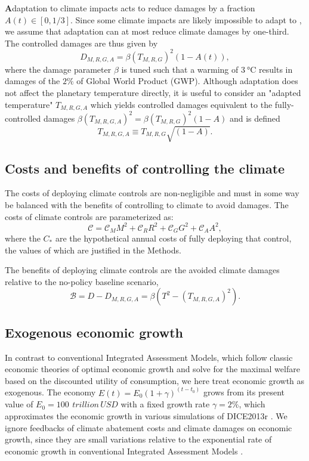 \documentclass[9pt,twocolumn,twoside,lineno]{pnas-new}
\begin{document}
\textbf{A}daptation to climate impacts acts to reduce damages by a fraction $A(t) \in [0, 1/3]$. Since some climate impacts are likely impossible to adapt to \cite[][]{dow_limits_2013}, we assume that adaptation can at most reduce climate damages by one-third. The controlled damages are thus given by
\begin{equation}
    D_{M,R,G,A} = \beta (T_{M,R,G})^{2} (1-A(t)),
    \label{eq:damages}
\end{equation}
where the damage parameter $\beta$ is tuned such that a warming of $\SI{3}{\celsius}$ results in damages of the $2\%$ of Global World Product (GWP). Although adaptation does not affect the planetary temperature directly, it is useful to consider an "adapted temperature" $T_{M,R,G,A}$ which yields controlled damages equivalent to the fully-controlled damages $\beta (T_{M,R,G,A})^{2} = \beta (T_{M,R,G})^{2} (1-A)$ and is defined
\begin{equation}
    T_{M,R,G,A} \equiv T_{M,R,G} \sqrt{(1-A)}.\label{eq:adapted-temperature}
\end{equation}

\subsection*{Costs and benefits of controlling the climate}

The costs of deploying climate controls are non-negligible and must in some way be balanced with the benefits of controlling to climate to avoid damages. The costs of climate controls are parameterized as:
\begin{equation}
    \mathcal{C} = \mathcal{C}_{M} M^{2} + \mathcal{C}_{R} R^{2} + \mathcal{C}_{G} G^{2} + \mathcal{C}_{A} A^{2},
\end{equation}
where the $C_{*}$ are the hypothetical annual costs of fully deploying that control, the values of which are justified in the Methods.

The benefits of deploying climate controls are the avoided climate damages relative to the no-policy baseline scenario,
\begin{equation}
    \mathcal{B} = D - D_{M,R,G,A} = \beta (T^{2} - (T_{M,R,G,A})^{2}).
\end{equation}

\subsection*{Exogenous economic growth}
In contrast to conventional Integrated Assessment Models, which follow classic economic theories of optimal economic growth and solve for the maximal welfare based on the discounted utility of consumption, we here treat economic growth as exogenous. The economy $E(t) = E_{0}(1 + \gamma)^{(t-t_{0})}$ grows from its present value of $E_{0} = \SI{100}{\,trillion\, USD}$ with a fixed growth rate $\gamma = 2\%$, which approximates the economic growth in various simulations of DICE2013r \cite{nordhaus2013dice}. We ignore feedbacks of climate abatement costs and climate damages on economic growth, since they are small variations relative to the exponential rate of economic growth in conventional Integrated Assessment Models \cite{nordhaus2013dice}.
\end{document}
